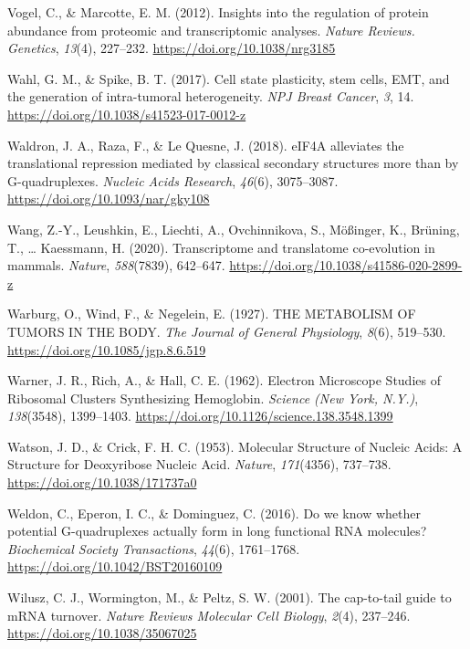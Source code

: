 \documentclass[12pt,openany]{book}
\begin{document}
\hypertarget{ref-Vogel2012}{}
Vogel, C., \& Marcotte, E. M. (2012). Insights into the regulation of
protein abundance from proteomic and transcriptomic analyses.
\emph{Nature Reviews. Genetics}, \emph{13}(4), 227--232.
\url{https://doi.org/10.1038/nrg3185}

\hypertarget{ref-Wahl2017}{}
Wahl, G. M., \& Spike, B. T. (2017). Cell state plasticity, stem cells,
EMT, and the generation of intra-tumoral heterogeneity. \emph{NPJ Breast
Cancer}, \emph{3}, 14. \url{https://doi.org/10.1038/s41523-017-0012-z}

\hypertarget{ref-Waldron2018}{}
Waldron, J. A., Raza, F., \& Le Quesne, J. (2018). eIF4A alleviates the
translational repression mediated by classical secondary structures more
than by G-quadruplexes. \emph{Nucleic Acids Research}, \emph{46}(6),
3075--3087. \url{https://doi.org/10.1093/nar/gky108}

\hypertarget{ref-Wang2020}{}
Wang, Z.-Y., Leushkin, E., Liechti, A., Ovchinnikova, S., Mößinger, K.,
Brüning, T., \ldots{} Kaessmann, H. (2020). Transcriptome and
translatome co-evolution in mammals. \emph{Nature}, \emph{588}(7839),
642--647. \url{https://doi.org/10.1038/s41586-020-2899-z}

\hypertarget{ref-Warburg1927}{}
Warburg, O., Wind, F., \& Negelein, E. (1927). THE METABOLISM OF TUMORS
IN THE BODY. \emph{The Journal of General Physiology}, \emph{8}(6),
519--530. \url{https://doi.org/10.1085/jgp.8.6.519}

\hypertarget{ref-Warner1962}{}
Warner, J. R., Rich, A., \& Hall, C. E. (1962). Electron Microscope
Studies of Ribosomal Clusters Synthesizing Hemoglobin. \emph{Science
(New York, N.Y.)}, \emph{138}(3548), 1399--1403.
\url{https://doi.org/10.1126/science.138.3548.1399}

\hypertarget{ref-Watson1953}{}
Watson, J. D., \& Crick, F. H. C. (1953). Molecular Structure of Nucleic
Acids: A Structure for Deoxyribose Nucleic Acid. \emph{Nature},
\emph{171}(4356), 737--738. \url{https://doi.org/10.1038/171737a0}

\hypertarget{ref-Weldon2016}{}
Weldon, C., Eperon, I. C., \& Dominguez, C. (2016). Do we know whether
potential G-quadruplexes actually form in long functional RNA molecules?
\emph{Biochemical Society Transactions}, \emph{44}(6), 1761--1768.
\url{https://doi.org/10.1042/BST20160109}

\hypertarget{ref-Wilusz2001}{}
Wilusz, C. J., Wormington, M., \& Peltz, S. W. (2001). The cap-to-tail
guide to mRNA turnover. \emph{Nature Reviews Molecular Cell Biology},
\emph{2}(4), 237--246. \url{https://doi.org/10.1038/35067025}
\end{document}
